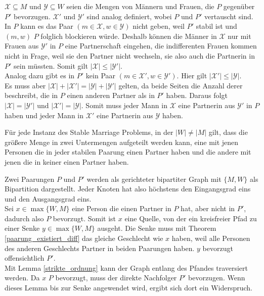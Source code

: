 \begin{Beweis}
\label{strikte_ordnung_bew}
  $\mathcal{X} \subseteq M$ und $\mathcal{Y} \subseteq W$ seien die Mengen von Männern und Frauen, die $P$ gegenüber $P'$ bevorzugen. $\mathcal{X'}$ und $\mathcal{Y'}$ sind analog definiert, wobei $P$ und $P'$ vertauscht sind.\\
  In $P$ kann es das Paar $(m \in \mathcal{X},w \in \mathcal{Y})$ nicht geben, weil $P'$ stabil ist und $(m,w)$ $P$ folglich blockieren würde. Deshalb können die Männer in $\mathcal{X}$ nur mit Frauen aus $\mathcal{Y'}$ in $P$ eine Partnerschaft eingehen, die indifferenten Frauen kommen nicht in Frage, weil sie den Partner nicht wechseln, sie also auch die Partnerin in $P'$ sein müssten. Somit gilt $|\mathcal{X}| \leq |\mathcal{Y'}|$.\\
  Analog dazu gibt es in $P'$ kein Paar $(m \in \mathcal{X'},w \in \mathcal{Y'})$. Hier gilt $|\mathcal{X'}| \leq |\mathcal{Y}|$.\\
  Es muss aber $|\mathcal{X}| + |\mathcal{X'}| = |\mathcal{Y}| + |\mathcal{Y'}|$ gelten, da beide Seiten die Anzahl derer beschreibt, die in $P$ einen anderen Partner als in $P'$ haben. Daraus folgt $|\mathcal{X}| = |\mathcal{Y'}|$ und $|\mathcal{X'}| = |\mathcal{Y}|$. Somit muss jeder Mann in $\mathcal{X}$ eine Partnerin aus $\mathcal{Y'}$ in $P$ haben und jeder Mann in $\mathcal{X'}$ eine Partnerin aus $\mathcal{Y}$ haben.
\end{Beweis}

\begin{Theorem}
\label{partner_oder_nicht_diff}
  Für jede Instanz des Stable Marriage Problems, in der $|W| \neq |M|$ gilt, dass die größere Menge in zwei Untermengen aufgeteilt werden kann, eine mit jenen Personen die in jeder stabilen Paarung einen Partner haben und die andere mit jenen die in keiner einen Partner haben.
\end{Theorem}

\begin{Beweis}
\label{partner_oder_nicht_diff_bew}
  Zwei Paarungen $P$ und $P'$ werden als gerichteter bipartiter Graph mit $\{M,W\}$ als Bipartition dargestellt. Jeder Knoten hat also höchstens den Eingangsgrad eins und den Ausgangsgrad eins.\\
  Sei $x \in \max\{W,M\}$ eine Person die einen Partner in $P$ hat, aber nicht in $P'$, dadurch also $P$ bevorzugt. Somit ist $x$ eine Quelle, von der ein kreisfreier Pfad zu einer Senke $y \in \max\{W,M\}$ ausgeht. Die Senke muss mit Theorem \ref{paarung_existiert_diff} das gleiche Geschlecht wie $x$ haben, weil alle Personen des anderen Geschlechts Partner in beiden Paarungen haben. $y$ bevorzugt offensichtlich $P'$.\\
  Mit Lemma \ref{strikte_ordnung} kann der Graph entlang des Pfandes traversiert werden. Da $x$ $P$ bevorzugt, muss der direkte Nachfolger $P'$ bevorzugen. Wenn dieses Lemma bis zur Senke angewendet wird, ergibt sich dort ein Widerspruch.
\end{Beweis}

